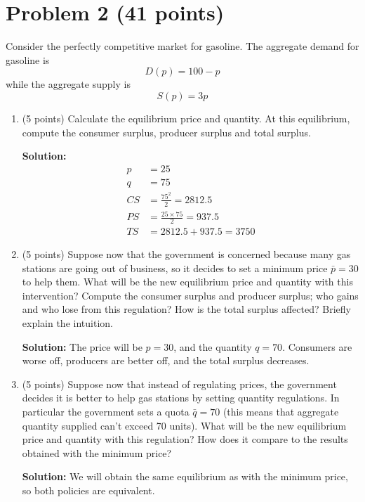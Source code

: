 \documentclass{article}
\begin{document}
\section*{Problem 2 (41 points)}
Consider the perfectly competitive market for gasoline. The aggregate demand for gasoline is 
\[D (p) = 100 - p\]
while the aggregate supply is 
\[S (p) = 3p\]
\begin{enumerate}
\item (5 points) Calculate the equilibrium price and quantity. At this equilibrium, compute the consumer surplus, producer surplus and total surplus.

\textbf{Solution:} 
\begin{align*}
p &= 25\\
q &= 75\\
CS &= \frac{75^2}{2} = 2812.5\\
PS &= \frac{25 × 75}{2} = 937.5\\
TS &= 2812.5 + 937.5 = 3750
\end{align*}

\item (5 points) Suppose now that the government is concerned because many gas stations are going out of business, so it decides to set a minimum price $\bar{p} = 30$ to help them. What will be the new equilibrium price and quantity with this intervention? Compute the consumer surplus and producer surplus; who gains and who lose from this regulation? How is the total surplus affected? Briefly explain the intuition.

\textbf{Solution:} The price will be $p = 30$, and the quantity $q = 70$. Consumers are worse off, producers are better off, and the total surplus decreases.

\item (5 points) Suppose now that instead of regulating prices, the government decides it is better to help gas stations by setting quantity regulations. In particular the government sets a quota $\bar{q} = 70$ (this means that aggregate quantity supplied can’t exceed 70 units). What will be the new equilibrium price and quantity with this regulation? How does it compare to the results obtained with the minimum price?


\textbf{Solution:} We will obtain the same equilibrium as with the minimum price, so both policies are equivalent.
\end{enumerate}
\end{document}
